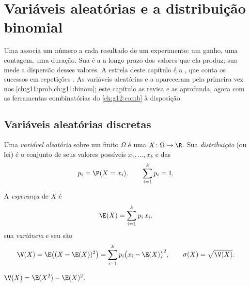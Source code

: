 \chapter{Variáveis aleatórias e a distribuição binomial}\label{ch:g12:randvar}

Uma  associa um número a cada resultado de um
experimento: um ganho, uma contagem, uma duração. Sua  é a 
a longo prazo dos valores que ela produz; sua  mede a dispersão
desses valores. A estrela deste capítulo é a , que
conta os sucessos em repetições . As variáveis aleatórias e a
 apareceram pela primeira vez nos
\cref{ch:g11:prob,ch:g11:binom}; este capítulo as revisa e as aprofunda,
agora com as ferramentas combinatórias do \cref{ch:g12:comb} à
disposição.

\section{Variáveis aleatórias discretas}

\begin{definition}\label{def:g12:randvar:rv}
Uma \emph{variável aleatória} sobre um  finito $\Omega$ é uma  $X \colon \Omega \to \R$. Sua
\emph{distribuição} (ou lei) é o conjunto de seus
valores possíveis $x_1, \dots, x_k$ e das 
\[
p_i = \P(X = x_i), \qquad \sum_{i=1}^{k} p_i = 1 .
\]
\end{definition}

\begin{definition}\label{def:g12:randvar:exp}
A \emph{esperança} de $X$ é
\[
\E(X) = \sum_{i=1}^{k} p_i\, x_i ,
\]
sua \emph{variância} e seu \emph{} são
\[
\V(X) = \E\bigl((X - \E(X))^2\bigr) = \sum_{i=1}^k p_i\bigl(x_i - \E(X)\bigr)^2,
\qquad
\sigma(X) = \sqrt{\V(X)} .
\]
\end{definition}

\begin{proposition}\label{prop:g12:randvar:konig}
$\V(X) = \E(X^2) - \E(X)^2$.
\end{proposition}

